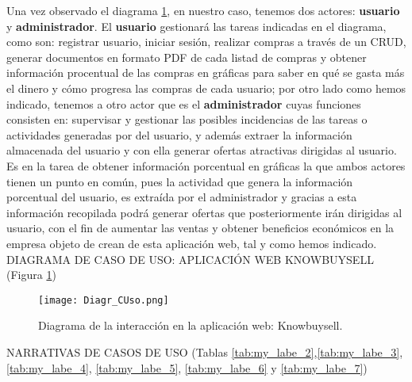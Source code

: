 \documentclass{article}
\begin{document}
Una vez observado el diagrama \ref{fig:diaUML1}, en nuestro caso, tenemos dos actores: \textbf{usuario} y \textbf{administrador}. El \textbf{usuario} gestionará las tareas indicadas en el diagrama, como son: registrar usuario, iniciar sesión, realizar compras a través de un CRUD, generar documentos en formato PDF de cada listad de compras y obtener información procentual de las compras en gráficas para saber en qué se gasta más el dinero y cómo progresa las compras de cada usuario; por otro lado como hemos indicado, tenemos a otro actor que es el \textbf{administrador} cuyas funciones consisten en: supervisar y gestionar las posibles incidencias de las tareas o actividades generadas por del usuario, y además extraer la información almacenada del usuario y con ella generar ofertas atractivas dirigidas al usuario. Es en la tarea de obtener información porcentual en gráficas la que ambos actores tienen un punto en común, pues la actividad que genera la información porcentual del usuario, es extraída por el administrador y gracias a esta información recopilada podrá generar ofertas que posteriormente irán dirigidas al usuario, con el fin de aumentar las ventas y obtener beneficios económicos en la empresa objeto de crean de esta aplicación web, tal y como hemos indicado.\\

DIAGRAMA DE CASO DE USO: APLICACIÓN WEB KNOWBUYSELL (Figura \ref{fig:diaUML1})

\begin{figure}[h]
\centering
\texttt{[image: Diagr\_CUso.png]}
\caption{\label{fig:diaUML1}Diagrama de la interacción en la aplicación web: Knowbuysell.}
\end{figure}

NARRATIVAS DE CASOS DE USO (Tablas \ref{tab:my_labe_2},\ref{tab:my_labe_3},\ref{tab:my_labe_4}, \ref{tab:my_labe_5}, \ref{tab:my_labe_6} y \ref{tab:my_labe_7})
\end{document}
